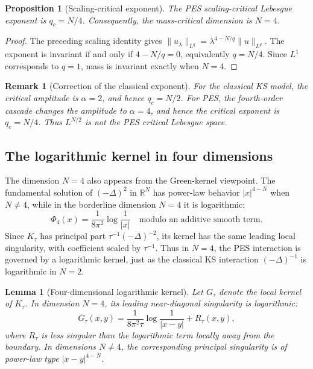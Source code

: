 \documentclass[pdflatex,sn-mathphys-num]{sn-jnl}%
\theoremstyle{thmstyleone}
\newtheorem{lemma}[theorem]{Lemma}
\newtheorem{proposition}[theorem]{Proposition}%
\theoremstyle{thmstyletwo}
\newtheorem{remark}{Remark}
\theoremstyle{thmstylethree}
\begin{document}
\begin{proposition}[Scaling-critical exponent]
\label{prop:critical-exponent}
The PES scaling-critical Lebesgue exponent is \(q_c=N/4\).  Consequently, the
mass-critical dimension is \(N=4\).
\end{proposition}

\begin{proof}
The preceding scaling identity gives
\(\|u_\lambda\|_{L^q}=\lambda^{4-N/q}\|u\|_{L^q}\).  The exponent is invariant
if and only if \(4-N/q=0\), equivalently \(q=N/4\).  Since \(L^1\) corresponds
to \(q=1\), mass is invariant exactly when \(N=4\).
\end{proof}

\begin{remark}[Correction of the classical exponent]
\label{rem:corrected-critical-space}
For the classical KS model, the critical amplitude is \(\alpha=2\),
and hence \(q_c=N/2\).  For PES, the fourth-order cascade changes the amplitude
to \(\alpha=4\), and hence the critical exponent is \(q_c=N/4\).  Thus
\(L^{N/2}\) is not the PES critical Lebesgue space.
\end{remark}

\subsection{The logarithmic kernel in four dimensions}

The dimension \(N=4\) also appears from the Green-kernel viewpoint.  The
fundamental solution of \((-\Delta)^2\) in \(\mathbb R^N\) has power-law
behavior \(|x|^{4-N}\) when \(N\ne4\), while in the borderline dimension
\(N=4\) it is logarithmic:
\[
        \Phi_4(x)
        =
        \frac{1}{8\pi^2}\log\frac1{|x|}
        \quad
        \text{modulo an additive smooth term}.
\]
Since \(K_\tau\) has principal part \(\tau^{-1}(-\Delta)^{-2}\), its kernel has
the same leading local singularity, with coefficient scaled by \(\tau^{-1}\).
Thus in \(N=4\), the PES interaction is governed by a logarithmic kernel, just
as the classical KS interaction \((-\Delta)^{-1}\) is logarithmic in
\(N=2\).

\begin{lemma}[Four-dimensional logarithmic kernel]
\label{lem:log-kernel-four-dim}
Let \(G_\tau\) denote the local kernel of \(K_\tau\).  In dimension \(N=4\), its
leading near-diagonal singularity is logarithmic:
\[
        G_\tau(x,y)
        =
        \frac{1}{8\pi^2\tau}\log\frac1{|x-y|}
        +
        R_\tau(x,y),
\]
where \(R_\tau\) is less singular than the logarithmic term locally away from
the boundary.  In dimensions \(N\ne4\), the corresponding principal singularity
is of power-law type \(|x-y|^{4-N}\).
\end{lemma}
\end{document}
